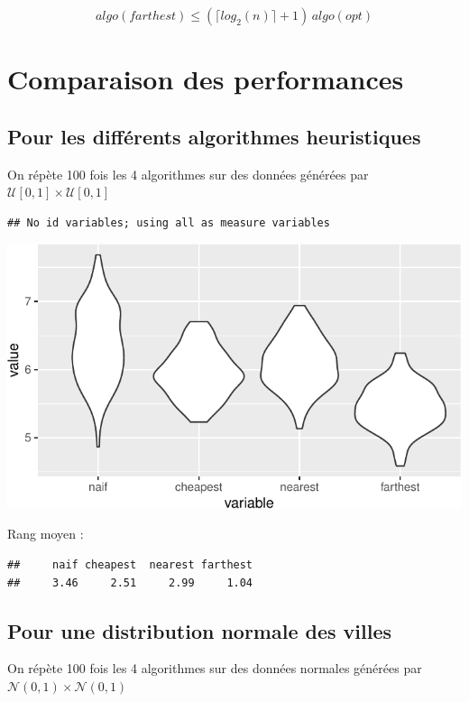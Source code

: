 \documentclass[
]{article}
\begin{document}
\[algo(farthest) \le (\lceil log_2(n) \rceil + 1) \,algo(opt)\]

\section{Comparaison des
performances}\label{comparaison-des-performances}

\subsection{Pour les différents algorithmes
heuristiques}\label{pour-les-diffuxe9rents-algorithmes-heuristiques}

On répète 100 fois les 4 algorithmes sur des données générées par
\(\mathcal{U}[0,1] \times \mathcal{U}[0,1]\)

\begin{verbatim}
## No id variables; using all as measure variables
\end{verbatim}

\includegraphics{TSP_analyse_files/figure-latex/unnamed-chunk-13-1.pdf}

Rang moyen :

\begin{verbatim}
##     naif cheapest  nearest farthest 
##     3.46     2.51     2.99     1.04
\end{verbatim}

\subsection{Pour une distribution normale des
villes}\label{pour-une-distribution-normale-des-villes}

On répète 100 fois les 4 algorithmes sur des données normales générées
par \(\mathcal{N}(0,1) \times \mathcal{N}(0,1)\)
\end{document}
